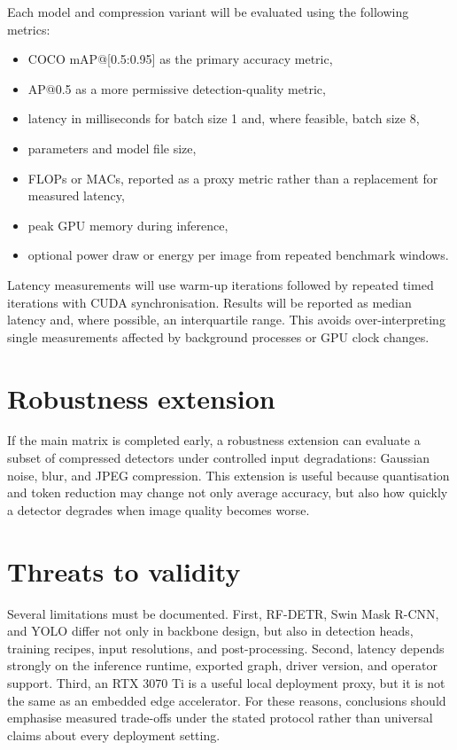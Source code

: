 \documentclass[a4paper,11pt,twoside]{report}
\theoremstyle{definition}
\begin{document}
Each model and compression variant will be evaluated using the following metrics:

\begin{itemize}
    \item COCO mAP@[0.5:0.95] as the primary accuracy metric,
    \item AP@0.5 as a more permissive detection-quality metric,
    \item latency in milliseconds for batch size 1 and, where feasible, batch size 8,
    \item parameters and model file size,
    \item FLOPs or MACs, reported as a proxy metric rather than a replacement for measured latency,
    \item peak GPU memory during inference,
    \item optional power draw or energy per image from repeated benchmark windows.
\end{itemize}

Latency measurements will use warm-up iterations followed by repeated timed iterations with CUDA synchronisation. Results will be reported as median latency and, where possible, an interquartile range. This avoids over-interpreting single measurements affected by background processes or GPU clock changes.

\section{Robustness extension}

If the main matrix is completed early, a robustness extension can evaluate a subset of compressed detectors under controlled input degradations: Gaussian noise, blur, and JPEG compression. This extension is useful because quantisation and token reduction may change not only average accuracy, but also how quickly a detector degrades when image quality becomes worse.

\section{Threats to validity}

Several limitations must be documented. First, RF-DETR, Swin Mask R-CNN, and YOLO differ not only in backbone design, but also in detection heads, training recipes, input resolutions, and post-processing. Second, latency depends strongly on the inference runtime, exported graph, driver version, and operator support. Third, an RTX 3070 Ti is a useful local deployment proxy, but it is not the same as an embedded edge accelerator. For these reasons, conclusions should emphasise measured trade-offs under the stated protocol rather than universal claims about every deployment setting.
\end{document}
